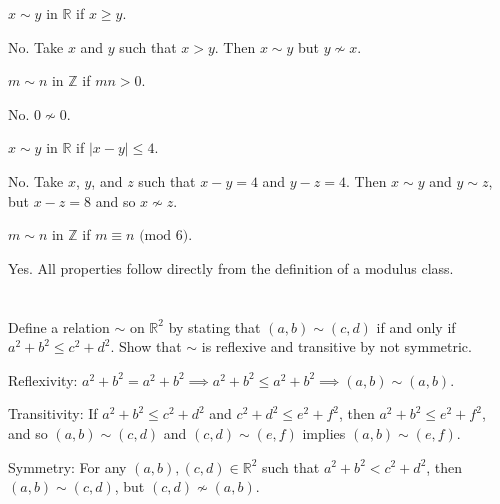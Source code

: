 \begin{exlist}
    \item $x \sim y$ in $\mathbb{R}$ if $x \geq y$.

    \smallskip

    No. Take $x$ and $y$ such that $x > y$. Then $x \sim y$ but $y \nsim x$.

    \item $m \sim n$ in $\mathbb{Z}$ if $mn > 0$.

    \smallskip

    No. $0 \nsim 0$.

    \item $x \sim y$ in $\mathbb{R}$ if $|x - y| \leq 4$.

    \smallskip

    No. Take $x$, $y$, and $z$ such that $x - y = 4$ and $y - z = 4$. Then $x \sim y$ and $y \sim z$, but $x - z = 8$ and so $x \nsim z$.

    \item $m \sim n$ in $\mathbb{Z}$ if $m \equiv n \text{ (mod 6)}$.

    \smallskip

    Yes. All properties follow directly from the definition of a modulus class.
\end{exlist}

\section{}\label{sec:1-26}

Define a relation $\sim$ on $\mathbb{R}^2$ by stating that $(a, b) \sim (c, d)$ if and only if $a^2 + b^2 \leq c^2 + d^2$. Show that $\sim$ is reflexive and transitive by not symmetric.
\hr

Reflexivity: $a^2 + b^2 = a^2 + b^2 \implies a^2 + b^2 \leq a^2 + b^2 \implies (a, b) \sim (a, b)$.

\smallskip

Transitivity: If $a^2 + b^2 \leq c^2 + d^2$ and $c^2 + d^2 \leq e^2 + f^2$, then $a^2 + b^2 \leq e^2 + f^2$, and so $(a, b) \sim (c, d)$ and $(c, d) \sim (e, f)$ implies $(a, b) \sim (e, f)$.

\smallskip

Symmetry: For any $(a, b), (c, d) \in \mathbb{R}^2$ such that $a^2 + b^2 < c^2 + d^2$, then $(a, b) \sim (c, d)$, but $(c, d) \nsim (a, b)$.

\section{}\label{sec:1-27}

